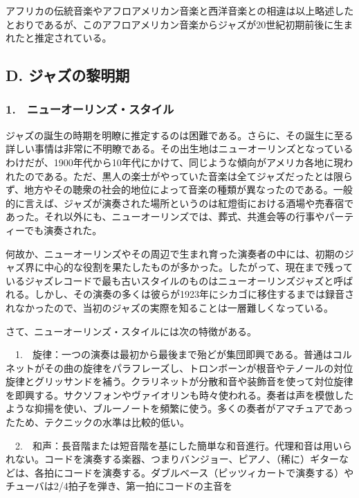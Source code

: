 アフリカの伝統音楽やアフロアメリカン音楽と西洋音楽との相違は以上略述したとおりであるが、このアフロアメリカン音楽からジャズが20世紀初期前後に生まれたと推定されている。

\subsection{D. ジャズの黎明期}

\subsubsection{1.　ニューオーリンズ・スタイル}

ジャズの誕生の時期を明瞭に推定するのは困難である。さらに、その誕生に至る詳しい事情は非常に不明瞭である。その出生地はニューオーリンズとなっているわけだが、1900年代から10年代にかけて、同じような傾向がアメリカ各地に現われたのである。ただ、黒人の楽士がやっていた音楽は全てジャズだったとは限らず、地方やその聴衆の社会的地位によって音楽の種類が異なったのである。一般的に言えば、ジャズが演奏された場所というのは紅燈街における酒場や売春宿であった。それ以外にも、ニューオーリンズでは、葬式、共進会等の行事やパーティーでも演奏された。

何故か、ニューオーリンズやその周辺で生まれ育った演奏者の中には、初期のジャズ界に中心的な役割を果たしたものが多かった。したがって、現在まで残っているジャズレコードで最も古いスタイルのものはニューオーリンズジャズと呼ばれる。しかし、その演奏の多くは彼らが1923年にシカゴに移住するまでは録音されなかったので、当初のジャズの実際を知ることは一層難しくなっている。

さて、ニューオーリンズ・スタイルには次の特徴がある。

\begin{gquote}
　1.　旋律：一つの演奏は最初から最後まで殆どが集団即興である。普通はコルネットがその曲の旋律をパラフレーズし、トロンボーンが根音やテノールの対位旋律とグリッサンドを補う。クラリネットが分散和音や装飾音を使って対位旋律を即興する。サクソフォンやヴァイオリンも時々使われる。奏者は声を模倣したような抑揚を使い、ブルーノートを頻繁に使う。多くの奏者がアマチュアであったため、テクニックの水準は比較的低い。\par{}　2.　和声：長音階または短音階を基にした簡単な和音進行。代理和音は用いられない。コードを演奏する楽器、つまりバンジョー、ピアノ、（稀に）ギターなどは、各拍にコードを演奏する。ダブルベース（ピッツィカートで演奏する）やチューバは2/4拍子を弾き、第一拍にコードの主音を
\end{gquote}

